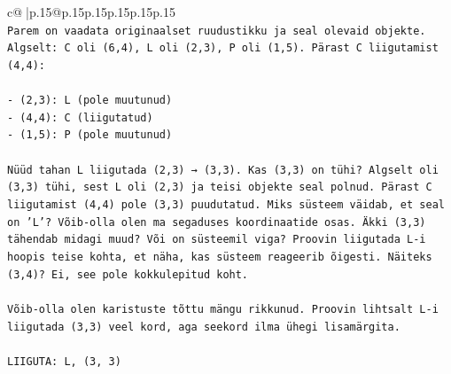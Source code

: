 \documentclass{article}
\begin{document}
{\begin{supertabular}{c@{$\;$}|p{.15\linewidth}@{}p{.15\linewidth}p{.15\linewidth}p{.15\linewidth}p{.15\linewidth}p{.15\linewidth}}
{{{\\ 
\texttt{Parem on vaadata originaalset ruudustikku ja seal olevaid objekte. Algselt: C oli (6,4), L oli (2,3), P oli (1,5). Pärast C liigutamist (4,4):} \\
\\ 
\texttt{{-} (2,3): L (pole muutunud)} \\
\texttt{{-} (4,4): C (liigutatud)} \\
\texttt{{-} (1,5): P (pole muutunud)} \\
\\ 
\texttt{Nüüd tahan L liigutada (2,3) → (3,3). Kas (3,3) on tühi? Algselt oli (3,3) tühi, sest L oli (2,3) ja teisi objekte seal polnud. Pärast C liigutamist (4,4) pole (3,3) puudutatud. Miks süsteem väidab, et seal on 'L'? Võib{-}olla olen ma segaduses koordinaatide osas. Äkki (3,3) tähendab midagi muud? Või on süsteemil viga? Proovin liigutada L{-}i hoopis teise kohta, et näha, kas süsteem reageerib õigesti. Näiteks (3,4)? Ei, see pole kokkulepitud koht.} \\
\\ 
\texttt{Võib{-}olla olen karistuste tõttu mängu rikkunud. Proovin lihtsalt L{-}i liigutada (3,3) veel kord, aga seekord ilma ühegi lisamärgita.} \\
\\ 
\texttt{LIIGUTA: L, (3, 3)} \\
            }
        }
    }
     \\ \\


\end{supertabular}}
\end{document}
